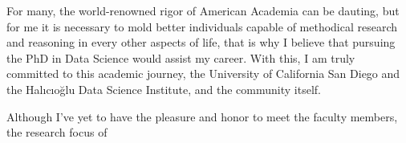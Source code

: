 	For many, the world-renowned rigor of American Academia can be dauting, but for me it is necessary to mold better individuals capable 
	of methodical research and reasoning in every other aspects of life, that is why I believe that pursuing the PhD in Data Science would
	assist my career. With this, I am truly committed to this academic journey, the University of California San Diego and the Halıcıoğlu Data Science Institute,
	and the community itself. 

	Although I've yet to have the pleasure and honor to meet the faculty members, the research focus of 
	

